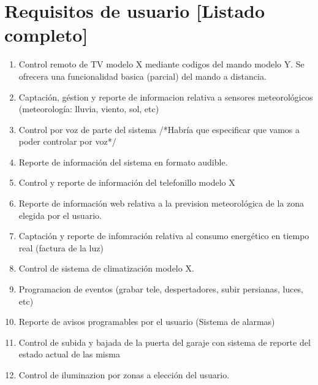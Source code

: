 \section{Requisitos de usuario [Listado completo]}
	\begin{enumerate}
			\item Control remoto de TV modelo X mediante codigos del mando modelo Y. Se ofrecera una funcionalidad basica (parcial) del mando a distancia.
			
			\item Captaci\'on, g\'estion y reporte de informacion relativa a sensores meteorol\'ogicos (meteorolog\'ia: lluvia, viento, sol, etc)
					
			\item Control por voz de parte del sistema /*Habr\'ia que especificar que vamos a poder controlar por voz*/
			
			\item Reporte de informaci\'on del sistema en formato audible.
			
			\item Control y reporte de informaci\'on del telefonillo modelo X
			
			\item Reporte de informaci\'on web relativa a la prevision meteorol\'ogica de la zona elegida por el usuario.
			
			\item Captaci\'on y reporte de infomraci\'on relativa al consumo energ\'etico en tiempo real (factura de la luz)
			
			\item Control de sistema de climatizaci\'on modelo X.
			
			\item Programacion de eventos (grabar tele, despertadores, subir persianas, luces, etc)
			
			\item Reporte de avisos programables por el usuario (Sistema de alarmas)
			
			\item Control de subida y bajada de la puerta del garaje con sistema de reporte del estado actual de las misma
			
			\item Control de iluminazion por zonas a elecci\'on del usuario.
			

\end{enumerate}
